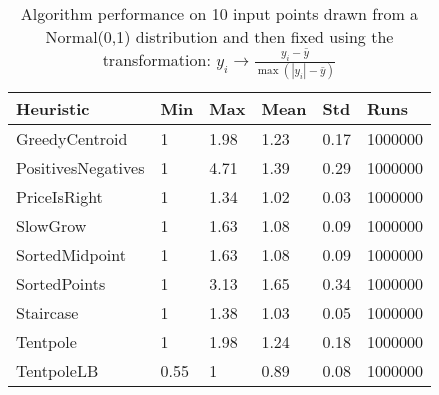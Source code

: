 \begin{table*} \centering
\begin{tabular}{|l|lllll|}
\hline
Heuristic & Min & Max & Mean & Std & Runs \\ \hline
GreedyCentroid& 1& 1.98& 1.23& 0.17& 1000000\\ 
PositivesNegatives& 1& 4.71& 1.39& 0.29& 1000000\\ 
PriceIsRight& 1& 1.34& 1.02& 0.03& 1000000\\ 
SlowGrow& 1& 1.63& 1.08& 0.09& 1000000\\ 
SortedMidpoint& 1& 1.63& 1.08& 0.09& 1000000\\ 
SortedPoints& 1& 3.13& 1.65& 0.34& 1000000\\ 
Staircase& 1& 1.38& 1.03& 0.05& 1000000\\ 
Tentpole& 1& 1.98& 1.24& 0.18& 1000000\\ \hline
TentpoleLB& 0.55& 1& 0.89& 0.08& 1000000\\ 
\hline
\end{tabular}
\caption{Algorithm performance on 10 input points drawn from a Normal(0,1) distribution and then fixed using the transformation: $y_i \rightarrow \frac{y_i - \bar{y} }{\max(|y_i| - \bar{y}) }$ }
\label{table:uniformResults}
\end{table*}


